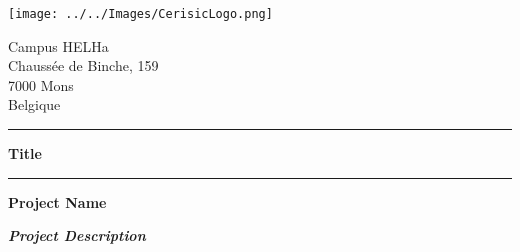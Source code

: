 
\begingroup
\thispagestyle{empty}

\vspace{2cm}
\begin{minipage}{0.47\textwidth}
	\begin{flushleft}
		\texttt{[image: ../../Images/CerisicLogo.png]}
	\end{flushleft}
\end{minipage}
\hfill
\begin{minipage}{0.47\textwidth}
	\begin{flushright}
		Campus HELHa\\
		Chaussée de Binche, 159\\
		7000 Mons\\
		Belgique
	\end{flushright}
\end{minipage}
\vspace{5cm}


\begin{center}
\rule{\textwidth}{1pt}

	\begin{huge}
		\textbf{Title}
	\end{huge}
\rule{\textwidth}{1pt}
\end{center}

\begin{flushright}
	\begin{Large}
		{\bf Project Name}
	\end{Large}

	\begin{large}
		{\bf \sl Project Description}
	\end{large}
\end{flushright}

